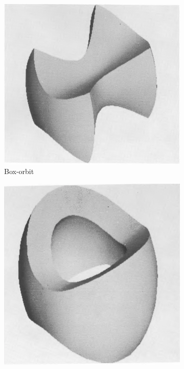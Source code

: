 \documentclass[english, oneside]{HYgradu}
\begin{document}
\begin{figure}
	\centering
	\begin{subfigure}[b]{0.49\textwidth}
		\includegraphics[width=\textwidth]{statler_box.png}
		\caption{Box-orbit}
	\end{subfigure}
	\begin{subfigure}[b]{0.49\textwidth}
		\includegraphics[width=\textwidth]{statler_short_tube.png}

\end{subfigure}
\end{figure}
\end{document}
